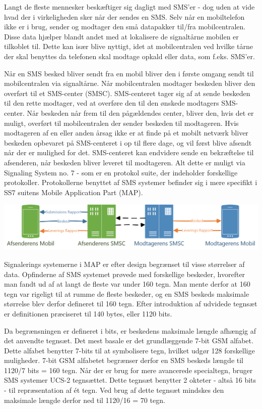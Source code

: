 Langt de fleste mennesker beskæftiger sig dagligt med SMS'er - dog uden at vide hvad der i virkeligheden sker når der sendes en SMS. Selv når en mobiltelefon ikke er i brug, sender og modtager den små datapakker til/fra mobilcentralen. Disse data hjælper blandt andet med at lokalisere de signaltårne mobilen er tilkoblet til. Dette kan især blive nyttigt, idet at mobilcentralen ved hvilke tårne der skal benyttes da telefonen skal modtage opkald eller data, som f.eks. SMS'er.

Når en SMS besked bliver sendt fra en mobil bliver den i første omgang sendt til mobilcentralen via signaltårne. Når mobilcentralen modtager beskeden bliver den overført til et SMS-center (SMSC). SMS-centeret tager sig af at sende beskeden til den rette modtager, ved at overføre den til den ønskede modtagers SMS-center. Når beskeden når frem til den pågældendes center, bliver den, hvis det er muligt, overført til mobilcentralen der sender beskeden til modtageren. Hvis modtageren af en eller anden årsag ikke er at finde på et mobilt netværk bliver beskeden opbevaret på SMS-centeret i op til flere dage, og vil først blive afsendt når der er mulighed for det. SMS-centeret kan endvidere sende en bekræftelse til afsenderen, når beskeden bliver leveret til modtageren. Alt dette er muligt via Signaling System no. 7 - som er en protokol suite, der indeholder forskellige protokoller. Protokollerne benyttet af SMS systemer befinder sig i mere specifikt i SS7 suitens Mobile Application Part (MAP). \cite{Pro_1} \cite{sms_max1}

\noindent
\includegraphics[width=\linewidth]{Billeder/Mobil.png}

Signalerings systemerne i MAP er efter design begrænset til visse størrelser af data. Opfinderne af SMS systemet prøvede med forskellige beskeder, hvorefter man fandt ud af at langt de fleste var under 160 tegn. Man mente derfor at 160 tegn var rigeligt til at rumme de fleste beskeder, og en SMS beskeds maksimale størrelse blev derfor defineret til 160 tegn. Efter introduktion af udvidede tegnsæt er definitionen præciseret til 140 bytes, eller 1120 bits. \cite{sms_max1} \cite{sms_max2}


Da begrænsningen er defineret i bits, er beskedens maksimale længde afhængig af det anvendte tegnsæt. Det mest basale er det grundlæggende 7-bit GSM alfabet. Dette alfabet benytter 7-bits til at symbolisere tegn, hvilket udgør 128 forskellige muligheder. 7-bit GSM alfabetet begrænser derfor en SMS beskeds længde til 1120/7 bits = 160 tegn. Når der er brug for mere avancerede specialtegn, bruger SMS systemer UCS-2 tegnsættet. Dette tegnsæt benytter 2 okteter - altså 16 bits - til repræsentation af ét tegn. Ved brug af dette tegnsæt mindskes den maksimale længde derfor ned til 1120/16 = 70 tegn. \cite{sms_pdu}

